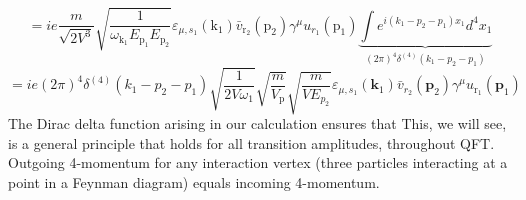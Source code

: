 $$
=ie \frac{m}{\sqrt{2 V^{3}}} \sqrt{\frac{1}{\omega_{\mathrm{k}_{1}} E_{\mathrm{p}_{1}} E_{\mathrm{p}_{2}}}} \varepsilon_{\mu, s_{1}}\left(\mathrm{k}_{1}\right) \bar{v}_{\mathrm{r}_{2}}\left(\mathrm{p}_{2}\right) \gamma^{\mu} u_{r_1}\left(\mathrm{p}_{1}\right)\underbrace{\int e^{i\left(k_{1}-p_{2}-p_{1}\right) x_{1}} d^{4} x_{1}}_{(2 \pi)^{4} \delta^{(4)}\left(k_{1}-p_{2}-p_{1}\right)}
$$
\begin{equation}
    =i e(2 \pi)^{4} \delta^{(4)}\left(k_{1}-p_{2}-p_{1}\right) \sqrt{\frac{1}{2 V \omega_{1}}} \sqrt{\frac{m}{V_{\mathrm{p}}}} \sqrt{\frac{m}{V E_{p_{2}}}} \varepsilon_{\mu, s_{1}}\left(\mathbf{k}_{1}\right) \bar{v}_{r_{2}}\left(\mathbf{p}_{2}\right) \gamma^{\mu} u_{\mathrm{r_1}}\left(\mathbf{p}_{1}\right)
    \label{S-1-fi}
\end{equation}
The Dirac delta function arising
in our calculation ensures that  This, we will see, is a general principle that holds for all transition amplitudes, throughout QFT. Outgoing 4-momentum for any interaction vertex (three particles interacting at a
point in a Feynman diagram) equals incoming 4-momentum.

